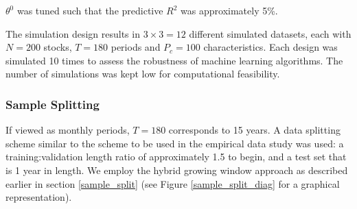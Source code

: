 \documentclass{article}
\begin{document}
$\theta^0$ was tuned such that the predictive $R^2$ was approximately 5\%.

The simulation design results in $3 \times 3 = 12$ different simulated datasets, each with $N = 200$ stocks, $T = 180$ periods and $P_c = 100$ characteristics. Each design was simulated 10 times to assess the robustness of machine learning algorithms. The number of simulations was kept low for computational feasibility.

\subsubsection{Sample Splitting}

If viewed as monthly periods, $T = 180$ corresponds to 15 years. A data splitting scheme similar to the scheme to be used in the empirical data study was used: a training:validation length ratio of approximately 1.5 to begin, and a test set that is 1 year in length. We employ the hybrid growing window approach as described earlier in section \ref{sample_split} (see Figure \ref{sample_split_diag} for a graphical representation).
\end{document}
